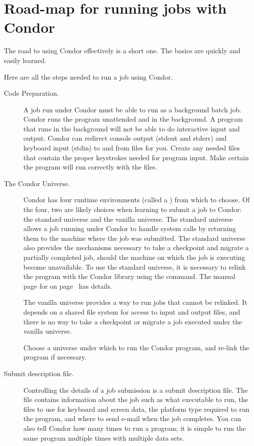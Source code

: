 \section{Road-map for running jobs with Condor}

The road to using Condor effectively is a short one.  The basics
are quickly and easily learned.

Here are all the steps needed to run a job using Condor.
\begin{description}

\item[Code Preparation.]
A job run under Condor must be able to 
run as a background batch job.
Condor runs the program unattended and in the background. 
A program that runs in the background will not be able
to do interactive input and output.
Condor can redirect console output (stdout and stderr)
and keyboard input (stdin)
to and from files for you.
Create any needed files that contain
the proper keystrokes needed for program input.
Make certain the program will run correctly with the files.

\item[The Condor Universe.]
Condor has four 
runtime environments (called a ) from which to choose.
Of the four, two are likely choices when learning
to submit a job to Condor: the standard universe and the vanilla universe.
The standard universe allows a job running under Condor to
handle system calls by returning them to the machine where the
job was submitted.
The standard universe also provides the mechanisms necessary
to take a checkpoint and migrate a partially completed job,
should the machine on which the job is executing become
unavailable.
To use the standard universe, it is necessary to
relink the program with the Condor library using the
 command.
The manual page for  on page~\pageref{man-condor-submit} has details.

The vanilla universe provides a way to run jobs that cannot be
relinked.
It depends on a shared file system for access to input and output
files,
and there is no way to take a checkpoint or migrate a job executed
under the vanilla universe.

Choose a universe under which to run the Condor program,
and re-link the program if necessary.

\item[Submit description file.]
Controlling the details of a job submission is a
submit description file.
The file contains information
about the job such as what executable to run, the
files to use for keyboard and screen data,
the platform type required to run the program, and
where to send e-mail when the job completes.
You can also tell Condor how many times to run a program;
it is simple to run the same program
multiple times with multiple data sets.


\end{description}
